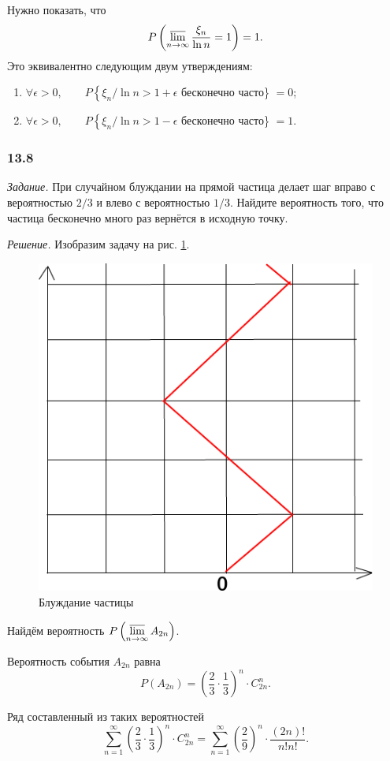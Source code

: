 Нужно показать, что
$$P \left( \varlimsup \limits_{n \to \infty } \frac{ \xi_n}{ \ln n} = 1 \right) =
1.$$
Это эквивалентно следующим двум утверждениям:
\begin{enumerate}
\item $ \forall \epsilon > 0, \qquad P \left\{ \xi_n / \ln n > 1 + \epsilon \right.$ бесконечно часто\} $= 0$;
\item $ \forall \epsilon > 0, \qquad P \left\{ \xi_n / \ln n > 1 - \epsilon \right.$ бесконечно часто\} $= 1$.
\end{enumerate}

\subsubsection*{13.8}

\textit{Задание.} При случайном блуждании на прямой частица делает шаг вправо с вероятностью $2/3$ и влево с вероятностью $1/3$.
Найдите вероятность того, что частица бесконечно много раз вернётся в исходную точку.

\textit{Решение.} Изобразим задачу на рис. \ref{fig:138}.

\begin{figure}[h!]
  \centering
  \includegraphics[width=.4\textwidth]{./pictures/13_8.png}
  \caption{Блуждание частицы}
  \label{fig:138}
\end{figure}

Найдём вероятность $P \left( \varlimsup \limits_{n \to \infty } A_{2n} \right) $.

Вероятность события $A_{2n}$ равна
$$P \left( A_{2n} \right) =
\left( \frac{2}{3} \cdot \frac{1}{3} \right)^n \cdot C_{2n}^n.$$

Ряд составленный из таких вероятностей
$$ \sum \limits_{n=1}^{ \infty } \left( \frac{2}{3} \cdot \frac{1}{3} \right)^n \cdot C_{2n}^n =
\sum \limits_{n=1}^{ \infty } \left( \frac{2}{9} \right)^n \cdot \frac{ \left( 2n \right)!}{n!n!}.$$

